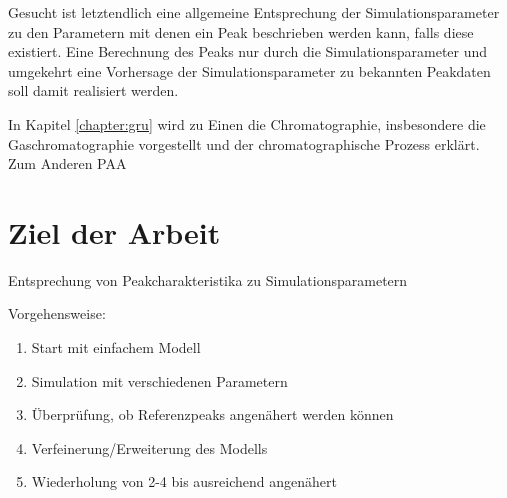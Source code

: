 Gesucht ist letztendlich eine allgemeine Entsprechung der Simulationsparameter zu den Parametern mit denen ein Peak beschrieben werden kann, falls diese existiert. Eine Berechnung des Peaks nur durch die Simulationsparameter und umgekehrt eine Vorhersage der Simulationsparameter zu bekannten Peakdaten soll damit realisiert werden.

In Kapitel \ref{chapter:gru} wird zu Einen die Chromatographie, insbesondere die Gaschromatographie vorgestellt und der chromatographische Prozess erklärt. Zum Anderen PAA


\section{Ziel der Arbeit}

Entsprechung von Peakcharakteristika zu Simulationsparametern

Vorgehensweise:
\begin{enumerate}
 \item <+-> Start mit einfachem Modell
 \item <+->  Simulation mit verschiedenen Parametern
 \item <+-> Überprüfung, ob Referenzpeaks angenähert werden können
 \item <+-> Verfeinerung/Erweiterung des Modells
 \item <+-> Wiederholung von 2-4 bis ausreichend angenähert
\end{enumerate}